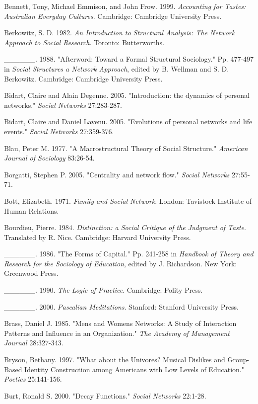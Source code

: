 \documentclass[
]{article}
\begin{document}
Bennett, Tony, Michael Emmison, and John Frow. 1999. \emph{Accounting for Tastes: Australian Everyday Cultures}. Cambridge: Cambridge University Press.

Berkowitz, S. D. 1982. \emph{An Introduction to Structural Analysis: The Network Approach to Social Research}. Toronto: Butterworths.

\_\_\_\_\_\_. 1988. "Afterword: Toward a Formal Structural Sociology." Pp. 477-497 in \emph{Social Structures a Network Approach}, edited by B. Wellman and S. D. Berkowitz. Cambridge: Cambridge University Press.

Bidart, Claire and Alain Degenne. 2005. "Introduction: the dynamics of personal networks." \emph{Social Networks} 27:283-287.

Bidart, Claire and Daniel Lavenu. 2005. "Evolutions of personal networks and life events." \emph{Social Networks} 27:359-376.

Blau, Peter M. 1977. "A Macrostructural Theory of Social Structure." \emph{American Journal of Sociology} 83:26-54.

Borgatti, Stephen P. 2005. "Centrality and network flow." \emph{Social Networks} 27:55-71.

Bott, Elizabeth. 1971. \emph{Family and Social Network}. London: Tavistock Institute of Human Relations.

Bourdieu, Pierre. 1984. \emph{Distinction: a Social Critique of the Judgment of Taste}. Translated by R. Nice. Cambridge: Harvard University Press.

\_\_\_\_\_\_. 1986. "The Forms of Capital." Pp. 241-258 in \emph{Handbook of Theory and Research for the Sociology of Education}, edited by J. Richardson. New York: Greenwood Press.

\_\_\_\_\_\_. 1990. \emph{The Logic of Practice}. Cambridge: Polity Press.

\_\_\_\_\_\_. 2000. \emph{Pascalian Meditations}. Stanford: Stanford University Press.

Brass, Daniel J. 1985. "Men\textquotesingle s and Women\textquotesingle s Networks: A Study of Interaction Patterns and Influence in an Organization." \emph{The Academy of Management Journal} 28:327-343.

Bryson, Bethany. 1997. "What about the Univores? Musical Dislikes and Group-Based Identity Construction among Americans with Low Levels of Education." \emph{Poetics} 25:141-156.

Burt, Ronald S. 2000. "Decay Functions." \emph{Social Networks} 22:1-28.
\end{document}
